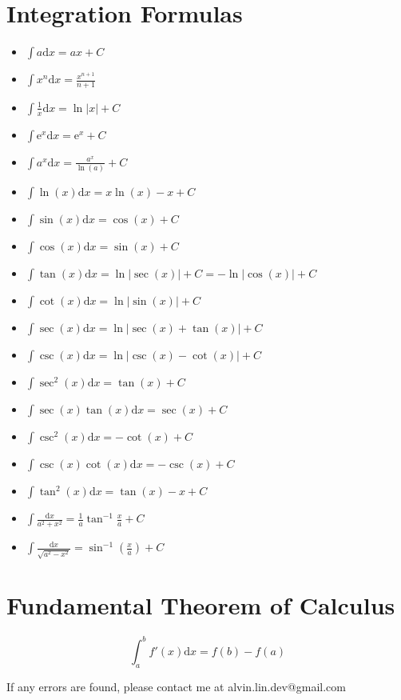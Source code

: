 \documentclass[letterpaper, 12pt]{article}
\renewcommand*{\arcsin}{\sin^{-1}}
\renewcommand*{\arctan}{\tan^{-1}}
\newcommand*{\diff}{\mathrm{d}}
\newcommand*{\e}{\mathrm{e}}
\begin{document}
\section{Integration Formulas}
\begin{itemize}
  \item \( \int{a\diff{x} = ax+C} \)
  \item \( \int{x^{n}\diff{x}} = \frac{x^{n+1}}{n + 1} \)
  \item \( \int{\frac{1}{x}\diff{x} = \ln|x|+C} \)
  \item \( \int{\e^{x}\diff{x} = \e^{x}+C} \)
  \item \( \int{a^{x}\diff{x} = \frac{a^{x}}{\ln(a)}+C} \)
  \item \( \int{\ln(x)\diff{x} = x\ln(x)-x+C} \)
  \item \( \int{\sin(x)\diff{x} = \cos(x)+C} \)
  \item \( \int{\cos(x)\diff{x} = \sin(x)+C} \)
  \item \( \int{\tan(x)\diff{x} = \ln|\sec(x)|+C = -\ln|\cos(x)|+C} \)
  \item \( \int{\cot(x)\diff{x} = \ln|\sin(x)|+C} \)
  \item \( \int{\sec(x)\diff{x} = \ln|\sec(x)+\tan(x)|+C} \)
  \item \( \int{\csc(x)\diff{x} = \ln|\csc(x)-\cot(x)|+C} \)
  \item \( \int{\sec^{2}(x)\diff{x} = \tan(x)+C} \)
  \item \( \int{\sec(x)\tan(x)\diff{x} = \sec(x)+C} \)
  \item \( \int{\csc^{2}(x)\diff{x} = -\cot(x)+C} \)
  \item \( \int{\csc(x)\cot(x)\diff{x} = -\csc(x)+C} \)
  \item \( \int{\tan^{2}(x)\diff{x} = \tan(x)-x+C} \)
  \item \( \int{\frac{\diff{x}}{a^{2}+x^{2}} =
          \frac{1}{a}\arctan{\frac{x}{a}}+C} \)
  \item \( \int{\frac{\diff{x}}{\sqrt{a^{2}-x^{2}}} = \arcsin(\frac{x}{a})+C} \)
\end{itemize}

\section{Fundamental Theorem of Calculus}
\[ \int_{a}^{b}{f'(x)\diff{x} = f(b) - f(a)} \]

\begin{center}
  If any errors are found, please contact me at alvin.lin.dev@gmail.com
\end{center}
\end{document}
